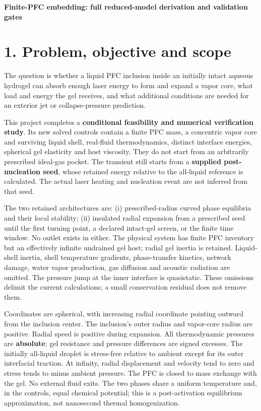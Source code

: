 \documentclass[10pt,a4paper]{article}
\begin{document}
\begin{center}\Large\bfseries Finite-PFC embedding: full reduced-model derivation and validation gates\end{center}
\section*{1. Problem, objective and scope}
The question is whether a liquid PFC inclusion inside an initially intact aqueous hydrogel can absorb enough laser energy to form and expand a vapor core, what load and energy the gel receives, and what additional conditions are needed for an exterior jet or collapse-pressure prediction.

This project completes a \textbf{conditional feasibility and numerical verification study}. Its new solved controls contain a finite PFC mass, a concentric vapor core and surviving liquid shell, real-fluid thermodynamics, distinct interface energies, spherical gel elasticity and host viscosity. They do not start from an arbitrarily prescribed ideal-gas pocket. The transient still starts from a \textbf{supplied post-nucleation seed}, whose retained energy relative to the all-liquid reference is calculated. The actual laser heating and nucleation event are not inferred from that seed.

The two retained architectures are: (i) prescribed-radius curved phase equilibria and their local stability; (ii) insulated radial expansion from a prescribed seed until the first turning point, a declared intact-gel screen, or the finite time window. No outlet exists in either. The physical system has finite PFC inventory but an effectively infinite undrained gel host; radial gel inertia is retained. Liquid-shell inertia, shell temperature gradients, phase-transfer kinetics, network damage, water vapor production, gas diffusion and acoustic radiation are omitted. The pressure jump at the inner interface is quasistatic. These omissions delimit the current calculations; a small conservation residual does not remove them.

Coordinates are spherical, with increasing radial coordinate pointing outward from the inclusion center. The inclusion's outer radius and vapor-core radius are positive. Radial speed is positive during expansion. All thermodynamic pressures are \textbf{absolute}; gel resistance and pressure differences are signed excesses. The initially all-liquid droplet is stress-free relative to ambient except for its outer interfacial traction. At infinity, radial displacement and velocity tend to zero and stress tends to minus ambient pressure. The PFC is closed to mass exchange with the gel. No external fluid exits. The two phases share a uniform temperature and, in the controls, equal chemical potential; this is a post-activation equilibrium approximation, not nanosecond thermal homogenization.
\end{document}
